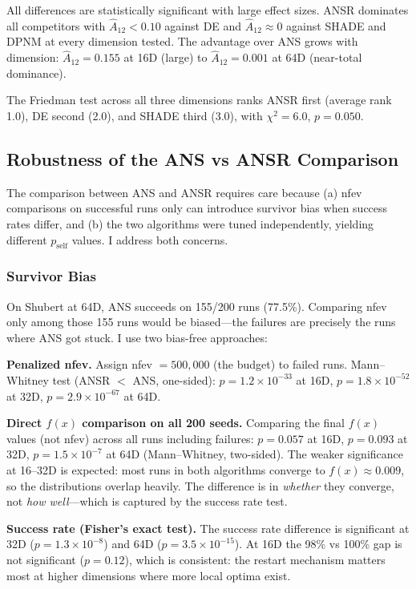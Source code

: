 \documentclass[11pt,a4paper]{article}
\begin{document}
All differences are statistically significant with large effect sizes. ANSR dominates all competitors with $\hat{A}_{12} < 0.10$ against DE and $\hat{A}_{12} \approx 0$ against SHADE and DPNM at every dimension tested. The advantage over ANS grows with dimension: $\hat{A}_{12} = 0.155$ at 16D (large) to $\hat{A}_{12} = 0.001$ at 64D (near-total dominance).

The Friedman test across all three dimensions ranks ANSR first (average rank 1.0), DE second (2.0), and SHADE third (3.0), with $\chi^2 = 6.0$, $p = 0.050$.

\subsection{Robustness of the ANS vs ANSR Comparison}

The comparison between ANS and ANSR requires care because (a) nfev comparisons on successful runs only can introduce survivor bias when success rates differ, and (b) the two algorithms were tuned independently, yielding different $p_{\text{self}}$ values. I address both concerns.

\subsubsection{Survivor Bias}

On Shubert at 64D, ANS succeeds on 155/200 runs (77.5\%). Comparing nfev only among those 155 runs would be biased---the failures are precisely the runs where ANS got stuck. I use two bias-free approaches:

\textbf{Penalized nfev.} Assign nfev $= 500{,}000$ (the budget) to failed runs. Mann--Whitney test (ANSR $<$ ANS, one-sided): $p = 1.2 \times 10^{-33}$ at 16D, $p = 1.8 \times 10^{-52}$ at 32D, $p = 2.9 \times 10^{-67}$ at 64D.

\textbf{Direct $f(x)$ comparison on all 200 seeds.} Comparing the final $f(x)$ values (not nfev) across all runs including failures: $p = 0.057$ at 16D, $p = 0.093$ at 32D, $p = 1.5 \times 10^{-7}$ at 64D (Mann--Whitney, two-sided). The weaker significance at 16--32D is expected: most runs in both algorithms converge to $f(x) \approx 0.009$, so the distributions overlap heavily. The difference is in \emph{whether} they converge, not \emph{how well}---which is captured by the success rate test.

\textbf{Success rate (Fisher's exact test).} The success rate difference is significant at 32D ($p = 1.3 \times 10^{-8}$) and 64D ($p = 3.5 \times 10^{-15}$). At 16D the 98\% vs 100\% gap is not significant ($p = 0.12$), which is consistent: the restart mechanism matters most at higher dimensions where more local optima exist.
\end{document}
